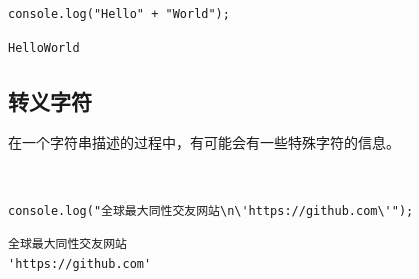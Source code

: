 \begin{lstlisting}[style=htmlcssjs]
console.log("Hello" + "World");
\end{lstlisting}

\begin{tcolorbox}
	\begin{verbatim}
HelloWorld
	\end{verbatim}
\end{tcolorbox}

\vspace{0.5cm}

\subsection{转义字符}

在一个字符串描述的过程中，有可能会有一些特殊字符的信息。

\begin{table}[H]
	\centering
	\caption{转义字符}
\end{table}

\\

\begin{lstlisting}[style=htmlcssjs]
console.log("全球最大同性交友网站\n\'https://github.com\'");
\end{lstlisting}

\begin{tcolorbox}
	\begin{verbatim}
全球最大同性交友网站
'https://github.com'
	\end{verbatim}
\end{tcolorbox}

